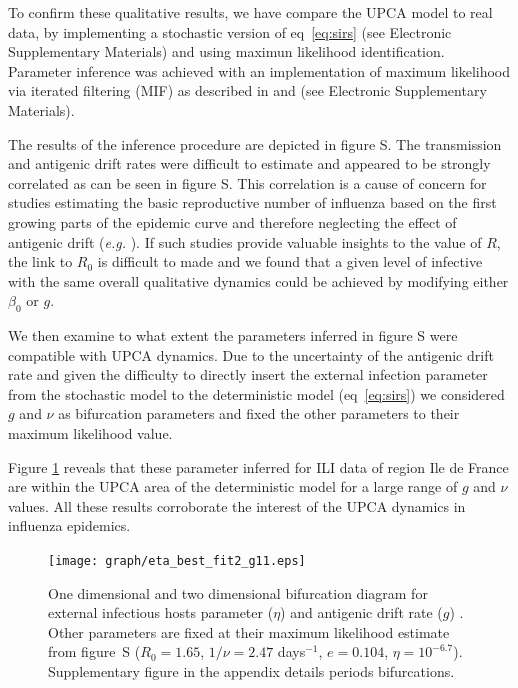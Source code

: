 \documentclass[12pt]{article}
\begin{document}
To confirm these qualitative results, we have compare the UPCA model
to real data, by implementing a stochastic version of
eq~\eqref{eq:sirs} (see Electronic Supplementary Materials) and using
maximun likelihood identification. Parameter inference was achieved
with an implementation of maximum likelihood via iterated filtering
(MIF) as described in \citet{Ionides2006} and \citet{Breto2009} (see
Electronic Supplementary Materials).


The results of the inference procedure are depicted in figure S. The
transmission and antigenic drift rates were difficult to estimate and
appeared to be strongly correlated as can be seen in figure S. This
correlation is a cause of concern for studies estimating the basic
reproductive number of influenza based on the first growing parts of
the epidemic curve and therefore neglecting the effect of antigenic
drift (\textit{e.g.} \citet{Chowell2008a}). If such studies provide
valuable insights to the value of $R$, the link to $R_0$ is difficult
to made \citep{McVernon2007, Mathews2009} and we found that a given
level of infective with the same overall qualitative dynamics could be
achieved by modifying either $\beta_0$ or $g$.

We then examine to what extent the parameters inferred in figure S
were compatible with UPCA dynamics. Due to the uncertainty of the
antigenic drift rate and given the difficulty to directly insert the
external infection parameter from the stochastic model to the
deterministic model (eq~\eqref{eq:sirs}) we considered $g$ and $\nu$
as bifurcation parameters and fixed the other parameters to their
maximum likelihood value.

Figure \ref{fig:eta_best_fit2} reveals that these parameter inferred
for ILI data of region Ile de France are within the UPCA area of the
deterministic model for a large range of $g$ and $\nu$ values. All
these results corroborate the interest of the UPCA dynamics in
influenza epidemics.




\begin{figure}[htb]
  \center
  \texttt{[image: graph/eta\_best\_fit2\_g11.eps]}
  \caption{One dimensional and two dimensional bifurcation diagram for
    external infectious hosts parameter ($\eta$) and antigenic drift
    rate ($g$) . Other parameters are fixed at their maximum
    likelihood estimate from figure~S ($R_0=1.65$,
    $1/\nu=2.47$ days$^{-1}$, $e=0.104$,
    $\eta=10^{-6.7}$). Supplementary figure in the appendix details
    periods bifurcations.}
  \label{fig:eta_best_fit2}
\end{figure}
\end{document}
